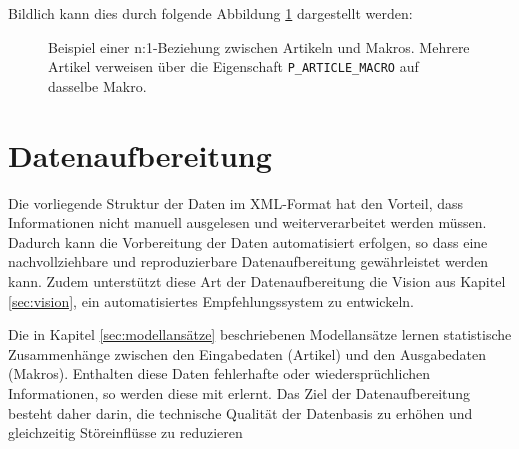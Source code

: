 Bildlich kann dies durch folgende Abbildung \ref{fig:artikel_macro_n_zu_1} dargestellt werden: 

\begin{figure}[H] 
    \centering 
    \caption{Beispiel einer n:1-Beziehung zwischen Artikeln und Makros. Mehrere Artikel verweisen über die Eigenschaft \texttt{P\_ARTICLE\_MACRO} auf dasselbe Makro.} 
    \label{fig:artikel_macro_n_zu_1} 
\end{figure}


\section{Datenaufbereitung} 
\label{sec:datenaufbereitung}

Die vorliegende Struktur der Daten im XML-Format hat den Vorteil, dass Informationen nicht manuell ausgelesen und weiterverarbeitet werden müssen.
Dadurch kann die Vorbereitung der Daten automatisiert erfolgen, so dass eine nachvollziehbare und reproduzierbare Datenaufbereitung gewährleistet werden kann.
Zudem unterstützt diese Art der Datenaufbereitung die Vision aus Kapitel \ref{sec:vision}, ein automatisiertes Empfehlungssystem zu entwickeln. 

Die in Kapitel \ref{sec:modellansätze} beschriebenen Modellansätze lernen statistische Zusammenhänge zwischen den Eingabedaten (Artikel) und den Ausgabedaten (Makros).
Enthalten diese Daten fehlerhafte oder wiedersprüchlichen Informationen, so werden diese mit erlernt. Das Ziel der Datenaufbereitung besteht daher darin, die technische Qualität der Datenbasis zu erhöhen und gleichzeitig Störeinflüsse zu reduzieren


